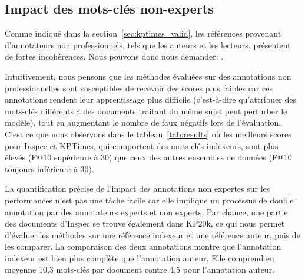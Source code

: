 
\subsection{Impact des mots-clés non-experts}
\label{sub:impact_perf_annot}

Comme indiqué dans la section~\ref{sec:kptimes_valid}, les références provenant d'annotateurs non professionnels, tels que les auteurs et les lecteurs, présentent de fortes incohérences.
Nous pouvons donc nous demander: .

Intuitivement, nous pensons que les méthodes évaluées sur des annotations non professionnelles sont susceptibles de recevoir des scores plus faibles car ces annotations rendent leur apprentissage plus difficile (c'est-à-dire qu'attribuer des mots-clés différents à des documents traitant du même sujet peut perturber le modèle), tout en augmentant le nombre de faux négatifs lors de l'évaluation.
%
C'est ce que nous observons dans le tableau~\ref{tab:results} où les meilleurs scores pour Inspec et KPTimes, qui comportent des mots-clés indexeurs, sont plus élevés (F@10 supérieure à 30) que ceux des autres ensembles de données (F@10 toujours inférieure à 30).

La quantification précise de l'impact des annotations non expertes sur les performances n'est pas une tâche facile car elle implique un processus de double annotation par des annotateurs experts et non experts.
Par chance, une partie des documents d'Inspec se trouve également dans KP20k, ce qui nous permet d'évaluer les méthodes sur une référence indexeur et une référence auteur, puis de les comparer.
La comparaison des deux annotations montre que l'annotation indexeur est bien plus complète que l'annotation auteur. Elle comprend en moyenne 10,3 mots-clés par document contre 4,5 pour l'annotation auteur.



